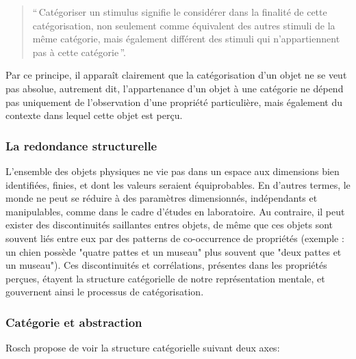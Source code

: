 \begin{quote}
``\,Catégoriser un stimulus signifie le considérer dans la finalité de cette catégorisation, non seulement comme équivalent des autres stimuli de la même catégorie, mais également différent des stimuli qui n'appartiennent pas à cette catégorie\,''.
\end{quote}

Par ce principe, il apparaît clairement que la catégorisation d'un objet ne se veut pas absolue, autrement dit, l'appartenance d'un objet à une catégorie ne dépend pas uniquement de l'observation d'une propriété particulière, mais également du contexte dans lequel cette objet est perçu.

\subsubsection{La redondance structurelle}

 L'ensemble des objets physiques ne vie pas dans un espace aux dimensions bien identifiées, finies, et dont les valeurs seraient équiprobables. En d'autres termes, le monde ne peut se réduire à des paramètres dimensionnés, indépendants et manipulables, comme dans le cadre d'études en laboratoire. Au contraire, il peut exister des discontinuités saillantes entres objets, de même que ces objets sont souvent liés entre eux par des patterns de co-occurrence de propriétés (exemple : un chien possède "quatre pattes et un museau" plus souvent que "deux pattes et un museau"). Ces discontinuités et corrélations, présentes dans les propriétés perçues, étayent la structure catégorielle de notre représentation mentale,  et gouvernent ainsi le processus de catégorisation.
 
\subsubsection{Catégorie et abstraction}
 
Rosch propose de voir la structure catégorielle suivant deux axes:

